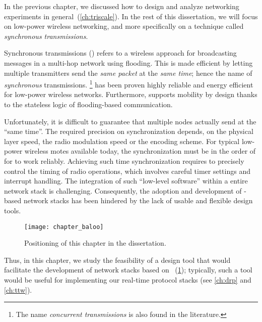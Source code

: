 
In the previous chapter, we discussed how to design and analyze networking experiments in general~(\cref{ch:triscale}).
In the rest of this dissertation, we will focus on low-power wireless networking, and more specifically on a technique called \emph{synchronous transmissions}.

Synchronous transmissions (\ST) refers to a wireless approach for broadcasting messages in a multi-hop network using flooding.
This is made efficient by letting multiple transmitters send the \emph{same packet} at the \emph{same time}; hence the name of \emph{synchronous} transmissions.%
\footnote{The name \textsl{concurrent transmissions} is also found in the literature.}
\ST has been proven highly reliable and energy efficient for low-power wireless networks.
Furthermore, \ST supports mobility by design thanks to the stateless logic of flooding-based communication.

Unfortunately, it is difficult to guarantee that multiple nodes actually send at the ``same time''.
The required precision on synchronization depends, \eg on the physical layer speed, the radio modulation speed or the encoding scheme.
For typical low-power wireless motes available today, the synchronization must be in the order of \us for \ST to work reliably.
Achieving such time synchronization requires to precisely control the timing of radio operations, which involves careful timer settings and interrupt handling.
The integration of such ``low-level software'' within a entire network stack is challenging.
Consequently, the adoption and development of \ST-based network stacks has been hindered by
the lack of usable and flexible design tools.

\begin{figure}
  \centering
  \texttt{[image: chapter\_baloo]}
  \caption{Positioning of this chapter in the dissertation.
  }
  \label{fig:chapter_baloo}
\end{figure}

Thus, in this chapter, we study the feasibility of a design tool that would facilitate the development of network stacks based on \ST~(\cref{fig:chapter_baloo}); typically, such a tool would be useful for implementing our real-time protocol stacks (see \cref{ch:drp} and \cref{ch:ttw}).

